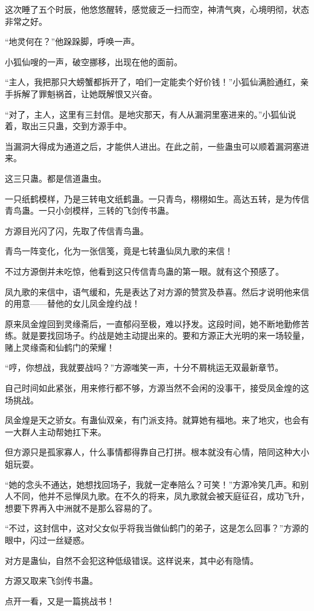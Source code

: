 \begin{this_body}
这次睡了五个时辰，他悠悠醒转，感觉疲乏一扫而空，神清气爽，心境明彻，状态非常之好。

“地灵何在？”他跺跺脚，呼唤一声。

小狐仙嗖的一声，破空挪移，出现在他的面前。

“主人，我把那只大螃蟹都拆开了，咱们一定能卖个好价钱！”小狐仙满脸通红，亲手拆解了罪魁祸首，让她既解恨又兴奋。

“对了，主人，这里有三封信。是地灾那天，有人从漏洞里塞进来的。”小狐仙说着，取出三只蛊，交到方源手中。

当漏洞大得成为通道之后，才能供人进出。在此之前，一些蛊虫可以顺着漏洞塞进来。

这三只蛊。都是信道蛊虫。

一只纸鹤模样，乃是三转电文纸鹤蛊。一只青鸟，栩栩如生。高达五转，是为传信青鸟蛊。一只小剑模样，三转的飞剑传书蛊。

方源目光闪了闪，先取了传信青鸟蛊。

青鸟一阵变化，化为一张信笺，竟是七转蛊仙凤九歌的来信！

不过方源倒并未吃惊，他看到这只传信青鸟蛊的第一眼。就有这个预感了。

凤九歌的来信中，语气缓和，先是表达了对方源的赞赏及恭喜。然后才说明他来信的用意——替他的女儿凤金煌约战！

原来凤金煌回到灵缘斋后，一直郁闷至极，难以抒发。这段时间，她不断地勤修苦练。就是要找回场子。约战是她主动提出来的。要和方源正大光明的来一场较量，赌上灵缘斋和仙鹤门的荣耀！

“哼，你想战，我就要战吗？”方源嗤笑一声，十分不屑桃运无双最新章节。

自己时间如此紧张，用来修行都不够，方源当然不会闲的没事干，接受凤金煌的这场挑战。

凤金煌是天之骄女。有蛊仙双亲，有门派支持。就算她有福地。来了地灾，也会有一大群人主动帮她扛下来。

但方源只是孤家寡人，什么事情都得靠自己打拼。根本就没有心情，陪同这种大小姐玩耍。

“她的念头不通达，她想找回场子，我就一定奉陪么？可笑！”方源冷笑几声。和别人不同，他并不忌惮凤九歌。在不久的将来，凤九歌就会被天庭征召，成功飞升，想要下界再入中洲就不是那么容易的了。

“不过，这封信中，这对父女似乎将我当做仙鹤门的弟子，这是怎么回事？”方源的眼中，闪过一丝疑惑。

对方是蛊仙，自然不会犯这种低级错误。这样说来，其中必有隐情。

方源又取来飞剑传书蛊。

点开一看，又是一篇挑战书！


\end{this_body}
